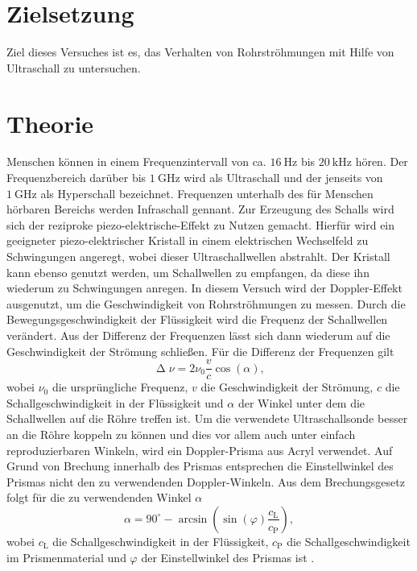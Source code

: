 \section{Zielsetzung}
\label{sec:Zielsetzung}

Ziel dieses Versuches ist es, das Verhalten von Rohrströhmungen mit Hilfe von Ultraschall zu untersuchen.

\section{Theorie}
\label{sec:Theorie}

Menschen können in einem Frequenzintervall von ca. $\SI{16}{\hertz}$ bis $\SI{20}{\kilo\hertz}$ hören. Der Frequenzbereich darüber bis $\SI{1}{\giga\hertz}$ wird als
Ultraschall und der jenseits von $\SI{1}{\giga\hertz}$ als Hyperschall bezeichnet. Frequenzen unterhalb des für Menschen hörbaren Bereichs werden Infraschall gennant.
\newline
Zur Erzeugung des Schalls wird sich der reziproke piezo-elektrische-Effekt zu Nutzen gemacht. Hierfür wird ein geeigneter piezo-elektrischer Kristall in einem
elektrischen Wechselfeld zu Schwingungen angeregt, wobei dieser Ultraschallwellen abstrahlt. Der Kristall kann ebenso genutzt werden, um Schallwellen zu empfangen,
da diese ihn wiederum zu Schwingungen anregen.
\newline
In diesem Versuch wird der Doppler-Effekt ausgenutzt, um die Geschwindigkeit von Rohrströhmungen zu messen. Durch die Bewegungsgeschwindigkeit der Flüssigkeit wird
die Frequenz der Schallwellen verändert. Aus der Differenz der Frequenzen lässt sich dann wiederum auf die Geschwindigkeit der Strömung schließen.
Für die Differenz der Frequenzen gilt
\begin{equation}
    \upDelta \nu = 2\nu_0 \frac{v}{c} \cos(\alpha),
    \label{eqn:df}
\end{equation}
\noindent
wobei $\nu_0$ die ursprüngliche Frequenz, $v$ die Geschwindigkeit der Strömung, $c$ die Schallgeschwindigkeit in der Flüssigkeit und $\alpha$ der Winkel unter dem die
Schallwellen auf die Röhre treffen ist.
\newline\newline
Um die verwendete Ultraschallsonde besser an die Röhre koppeln zu können und dies vor allem auch unter einfach reproduzierbaren Winkeln, wird ein Doppler-Prisma aus
Acryl verwendet. Auf Grund von Brechung innerhalb des Prismas entsprechen die Einstellwinkel des Prismas nicht den zu verwendenden Doppler-Winkeln. Aus dem
Brechungsgesetz folgt für die zu verwendenden Winkel $\alpha$
\begin{equation}
    \alpha = 90^\circ - \arcsin(\sin(\varphi)\frac{c_\text{L}}{c_\text{P}}),
    \label{eqn:alpha}
\end{equation}
\noindent
wobei $c_\text{L}$ die Schallgeschwindigkeit in der Flüssigkeit, $c_\text{P}$ die Schallgeschwindigkeit im Prismenmaterial und $\varphi$ der Einstellwinkel des Prismas ist \cite{AnleitungUS3}.
